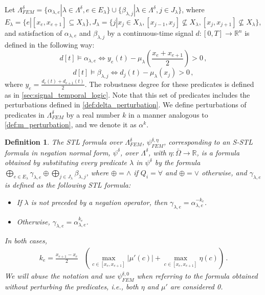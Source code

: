 \documentclass[letterpaper, 10 pt, conference]{ieeeconf/ieeeconf}
\newtheorem{definition}{Definition}
\newcommand*{\R}{\mathbb{R}}
\begin{document}
Let $\Lambda^{\delta}_{FEM} = \{\alpha_{\lambda, e} | \lambda \in
\Lambda^{\delta}, e \in E_{\lambda}\} \cup \{\beta_{\lambda, j} | \lambda \in
\Lambda^{\delta}, j \in J_{\lambda}\}$, where $E_{\lambda} = \{e | [x_e, x_{e+1}] \subseteq
X_{\lambda}\}, J_{\lambda} = \{j | x_j \in X_\lambda, [x_{j-1}, x_j] \not\subseteq
X_\lambda, [x_{j}, x_{j+1}] \not\subseteq X_\lambda \}$,
and satisfaction of $\alpha_{\lambda, e}$ and $\beta_{\lambda, j}$ by 
a continuous-time signal $d : [0, T] \to \R^n$
is defined in the following way:
%
\begin{equation}
    d[t] \models \alpha_{\lambda, e} \iff y_e(t) - 
    \mu_\lambda(\frac{x_e + x_{e + 1}}{2}) > 0 \,,
\end{equation}
%
\begin{equation}
     d[t] \models \beta_{\lambda, j} \iff d_j(t) - \mu_\lambda(x_j) > 0 \,,
\end{equation}
%
where $y_e = \frac{d_e(t) + d_{e+1}(t)}{2}$. The robustness degree for these
predicates is defined as in \cref{sec:signal_temporal_logic}.
Note that this set of predicates includes the perturbations defined in
\cref{def:delta_perturbation}. We define perturbations of predicates in
$\Lambda^{\delta}_{FEM}$ by a real number $k$ in a manner analogous to
\cref{def:m_perturbation}, and we denote it as $\alpha^k$.

\begin{definition} 
\label{def:eta_approximation}
    The STL formula over $\Lambda^{\delta}_{FEM}$, $\psi^{\delta, \eta}_{FEM}$,
    corresponding to an S-STL
    formula in negation normal form, $\psi^\delta$, over $\Lambda^\delta$, with
    $\eta : \bar\Omega \to \R$, is a formula obtained by substituting every
    predicate $\lambda$ in $\psi^\delta$ by the formula $\bigoplus_{e \in
    E_\lambda} \gamma_{\lambda,e} \oplus \bigoplus_{j \in J_\lambda} \beta_{\lambda, j}$, 
    where $\oplus = \wedge$ if $Q_i = \forall$ and $\oplus = \vee$
    otherwise, and $\gamma_{\lambda,e}$ is defined as the following STL formula:

    \begin{itemize}
        \item If $\lambda$ is not preceded by a negation operator, then
            $\gamma_{\lambda, e} = \alpha_{\lambda, e}^{-k_e}$.
        \item Otherwise, $\gamma_{\lambda, e} = \alpha_{\lambda, e}^{k_e}$.
    \end{itemize}

    In both cases, 
    \begin{equation}
    \begin{aligned}
        k_e = \frac{x_{e+1} - x_e}{2} & \left (\max_{c \in [x_e, x_{e+1}]}
        |\mu'(c)| + \max_{c \in [x_e, x_{e+1}]} \eta(c) \right ) \,.
    \end{aligned}
    \end{equation}
    We will abuse the notation and use $\psi^{\delta, 0}_{FEM}$ when referring
    to the formula obtained without perturbing the predicates, i.e., both $\eta$
    and $\mu'$ are considered 0.
\end{definition}
\end{document}
